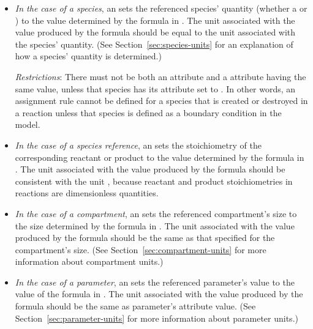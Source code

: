 \begin{itemize}
  
\item \emph{In the case of a species}, an \AssignmentRule sets the
  referenced species' quantity (whether a 
  or ) to the value determined by the formula in
  .  The unit associated with the value produced by
  the  formula should be equal to the unit associated
  with the species' quantity.  (See
  Section~\ref{sec:species-units} for an explanation of how a
  species' quantity is determined.)
  
  \emph{Restrictions}: There must not be both an \AssignmentRule
   attribute and a \SpeciesReference {}
  attribute having the same value, unless that species has its
   attribute set to .  In other
  words, an assignment rule cannot be defined for a species that
  is created or destroyed in a reaction unless that species is
  defined as a boundary condition in the model.

\item \emph{In the case of a species reference}, an
  \AssignmentRule sets the stoichiometry of the corresponding
  reactant or product to the value determined by the formula in
  .  The unit associated with the value produced by
  the  formula should be consistent with the unit
  , because reactant and product
  stoichiometries in reactions are dimensionless quantities.

\item \emph{In the case of a compartment}, an \AssignmentRule sets
  the referenced compartment's size to the size determined by the
  formula in .  The unit associated with the value
  produced by the  formula should be the same as that
  specified for the compartment's size.  (See
  Section~\ref{sec:compartment-units} for more information about
  compartment units.)
  
\item \emph{In the case of a parameter}, an \AssignmentRule sets
  the referenced parameter's value to the value of the formula in
  .  The unit associated with the value produced by
  the formula should be the same as parameter's 
  attribute value.  (See Section~\ref{sec:parameter-units} for
  more information about parameter units.)

\end{itemize}

